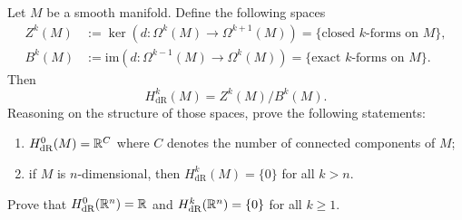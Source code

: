 \begin{exercise}
	Let $M$ be a smooth manifold. Define the following spaces
	\begin{align}
		Z^k(M) & := \ker(d:\Omega^{k}(M) \to \Omega^{k+1}(M)) = \{ \mbox{closed $k$-forms on $M$} \},       \\
		B^k(M) & := \mathrm{im}(d:\Omega^{k-1}(M) \to \Omega^{k}(M)) = \{ \mbox{exact $k$-forms on $M$} \}.
	\end{align}
	Then
	\begin{equation}
		H^k_{\mathrm{dR}}(M) = Z^k(M)/B^k(M).
	\end{equation}
	Reasoning on the structure of those spaces, prove the following statements:
	\begin{enumerate}
		\item $H^0_{\mathrm{dR}}(M) = \mathbb{R}^C$ where $C$ denotes the number of connected components of $M$;
		\item if $M$ is $n$-dimensional, then $H^k_{\mathrm{dR}}(M) = \{0\}$ for all $k > n$.
	\end{enumerate}
\end{exercise}

\begin{exercise}
	Prove that $H^0_{\mathrm{dR}}(\mathbb{R}^n) = \mathbb{R}$ and $H^k_{\mathrm{dR}}(\mathbb{R}^n) = \{0\}$ for all $k \geq 1$.
\end{exercise}

